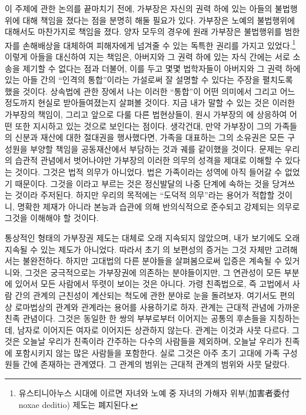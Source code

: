 이 주제에 관한 논의를 끝마치기 전에,
가부장은 자신의 권력 하에 있는 아들의 불법행위에 대해
책임을 졌다는 점을 분명히 해둘 필요가 있다.
가부장은 노예의 불법행위에 대해서도 마찬가지로 책임을 졌다.
양자 모두의 경우에
원래
가부장은
불법행위를 범한 자를
손해배상을 대체하여
피해자에게 넘겨줄 수 있는 독특한 권리를 가지고 있었다.\footnote{%
  유스티니아누스 시대에 이르면
  자녀와 노예 중 자녀의 가해자 위부(加害者委付\,noxae deditio) 제도는
  폐지된다.  }
이렇게 아들을 대신하여 지는 책임은,
아버지와 그 권력 하에 있는 자식 간에는
서로 소송을 제기할 수 없다는 점과 더불어,
이를 두고 몇몇 법학자들이
아버지와 그 권력 하에 있는 아들 간의
``인격의 통합''이라는 가설로써 잘 설명할 수 있다는
주장을 펼치도록 했을 것이다.
상속법에 관한 장에서 나는 이러한 ``통합''이 어떤 의미에서
그리고 어느 정도까지 현실로 받아들여졌는지 살펴볼 것이다.
지금 내가 말할 수 있는 것은
이러한 가부장의 책임이, 그리고 앞으로 다룰 다른 법현상들이,
원시 가부장의 에 상응하여 어떤  또한
지시하고 있는 것으로 보인다는 점이다.
생각건대,
만약 가부장이 그의 가족들의 신분과 재산에 대한 절대권을 행사했다면,
가족을 대표하는 그의 소유권은 모든 구성원을 부양할 책임을 공동재산에서
부담하는 것과 궤를 같이했을 것이다.
문제는 우리의 습관적 관념에서 벗어나야만 가부장의 이러한 의무의 성격을
제대로 이해할 수 있다는 것이다.
그것은 법적 의무가 아니었다. 법은 가족이라는 성역에 아직
들어갈 수 없었기 때문이다.
그것을 이라고 부르는 것은 정신발달의 나중 단계에 속하는 것을
당겨쓰는 것이라 주저된다.
하지만 우리의 목적에는 ``도덕적 의무''라는 용어가 적합할 것이니,
명확한 제재가 아니라 본능과 습관에 의해 반의식적으로
준수되고 강제되는 의무로 그것을 이해해야 할 것이다.

통상적인 형태의 가부장권 제도는 대체로 오래 지속되지 않았으며,
내가 보기에도 오래 지속될 수 있는 제도가 아니었다.
따라서 초기 의 보편성의 증거는 그것 자체만 고려해서는 불완전하다.
하지만 고대법의 다른 분야들을 살펴봄으로써 입증은 계속될 수 있거니와,
그것은 궁극적으로는 가부장권에 의존하는 분야들이지만,
그 연관성이 모든 부분에 있어서 모든 사람에서 뚜렷이 보이는 것은 아니다.
가령 친족법으로,
즉 고법에서 사람 간의 관계의 근친성이 계산되는 척도에 관한 분야로
눈을 돌려보자.
여기서도 편의상 로마법상의 관계와
관계라는 용어를 사용하기로 하자.
관계는 근대적 관념에 가까운 친족 관념이다.
그것은 동일한 한 쌍의 부부로부터 이어지는 공통의 후손들을 지칭하는데,
남자로 이어지든 여자로 이어지든 상관하지 않는다.
관계는 이것과 사뭇 다르다.
그것은 오늘날 우리가 친족이라 간주하는 다수의 사람들을 제외하며,
오늘날 우리가 친족에 포함시키지 않는 많은 사람들을 포함한다.
실로 그것은 아주 초기 고대에 가족 구성원들 간에 존재하는 관계였다.
그 관계의 범위는 근대적 관계의 범위와 사뭇 달랐다.

